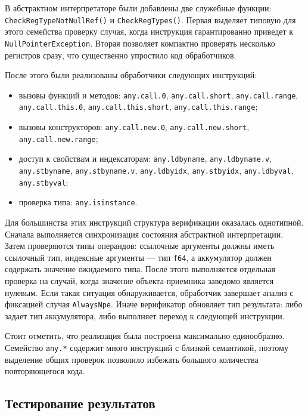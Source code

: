 В абстрактном интерпретаторе были добавлены две служебные функции:
\texttt{CheckRegTypeNotNullRef()} и \texttt{CheckRegTypes()}. Первая выделяет типовую для этого
семейства проверку случая, когда инструкция гарантированно приведет к \texttt{NullPointerException}.
Вторая позволяет компактно проверять несколько регистров сразу, что существенно упростило код
обработчиков.

После этого были реализованы обработчики следующих инструкций:
\begin{itemize}
    \item вызовы функций и методов:
    \texttt{any.call.0}, \texttt{any.call.short}, \newline \texttt{any.call.range},
    \texttt{any.call.this.0}, \texttt{any.call.this.short}, \newline \texttt{any.call.this.range};
    \item вызовы конструкторов:
    \texttt{any.call.new.0}, \texttt{any.call.new.short}, \newline \texttt{any.call.new.range};
    \item доступ к свойствам и индексаторам:
    \texttt{any.ldbyname}, \texttt{any.ldbyname.v}, \texttt{any.stbyname},
    \texttt{any.stbyname.v}, \texttt{any.ldbyidx}, \texttt{any.stbyidx},
    \texttt{any.ldbyval}, \texttt{any.stbyval};
    \item проверка типа:
    \texttt{any.isinstance}.
\end{itemize}

Для большинства этих инструкций структура верификации оказалась однотипной. Сначала выполняется
синхронизация состояния абстрактной интерпретации. Затем проверяются типы
операндов: ссылочные аргументы должны иметь ссылочный тип, индексные аргументы --- тип
\texttt{f64}, а аккумулятор должен содержать значение ожидаемого типа. После этого выполняется
отдельная проверка на случай, когда значение объекта-приемника заведомо является нулевым. Если такая ситуация 
обнаруживается, обработчик завершает анализ с фиксацией случая \texttt{AlwaysNpe}. 
Иначе верификатор обновляет тип результата:
либо задает тип аккумулятора, либо выполняет переход к следующей
инструкции.

Стоит отметить, что реализация была построена максимально единообразно.
Семейство \texttt{any.*} содержит много инструкций с близкой семантикой, поэтому выделение общих
проверок позволило избежать большого количества повторяющегося кода.

\subsection{Тестирование результатов}

